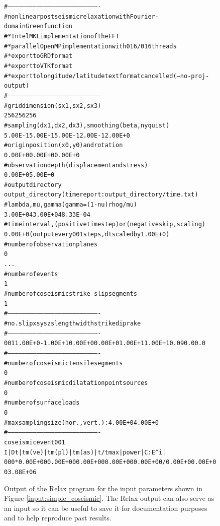 \documentclass[10pt]{article}
\begin{document}
\begin{figure}
\begin{alltt}
# ----------------------------------------------------------------------------
#      nonlinear postseismic relaxation with Fourier-domain Green function
#      * Intel MKL implementation of the FFT
#      * parallel OpenMP implementation with 016/016 threads
#      * export to GRD format
#      * export to VTK format
#      {\color{NavyBlue}* export to longitude/latitude text format cancelled (--no-proj-output)}
# ----------------------------------------------------------------------------
# grid dimension (sx1,sx2,sx3)
  256  256  256
# sampling (dx1,dx2,dx3), smoothing (beta, nyquist)
  5.00E-1  5.00E-1  5.00E-1  2.00E-1  2.00E+0
# origin position (x0,y0) and rotation
  0.00E+0  0.00E+0  0.00E+0
# observation depth (displacement and stress)
  0.00E+0  5.00E+0
# output directory
 output_directory (time report: output_directory/time.txt)
# lambda, mu, gamma (gamma = (1 - nu) rho g / mu)
  3.00E+04  3.00E+04  8.33E-04
# time interval, (positive time step) or (negative skip, scaling)
  0.00E+0 (output every 001 steps, dt scaled by 1.00E+0)
# number of observation planes
    0
...
# number of events
    1
# number of coseismic strike-slip segments
    1
# ----------------------------------------------------------------------------
# no.     slip       xs       ys       zs  length   width strike   dip   rake
# ----------------------------------------------------------------------------
001  1.00E+0 -1.00E+1  0.00E+0  0.00E+0 1.00E+1 1.00E+1    0.0  90.0    0.0
# ----------------------------------------------------------------------------
# number of coseismic tensile segments
    0
# number of coseismic dilatation point sources
    0
# number of surface loads
    0
# {\color{NavyBlue}max sampling size (hor.,vert.): 4.00E+0 4.00E+0}
# ----------------------------------------------------------------------------
coseismic event 001
 I  |   Dt   | tm(ve) | tm(pl) | tm(as) |     t/tmax     | power  |  C:E^i |
{\color{NavyBlue}000* 0.00E+00 0.00E+00 0.00E+00 0.00E+00 0.00E+00/0.00E+0 0.00E+00 3.08E+06}
\end{alltt}
\caption{Output of the Relax program for the input parameters shown in Figure \ref{input:simple_coseismic}. The Relax output can also serve as an input so it can be useful to save it for documentation purposes and to help reproduce past results.}
\label{input:out_coseismic}
\end{figure}
\end{document}
